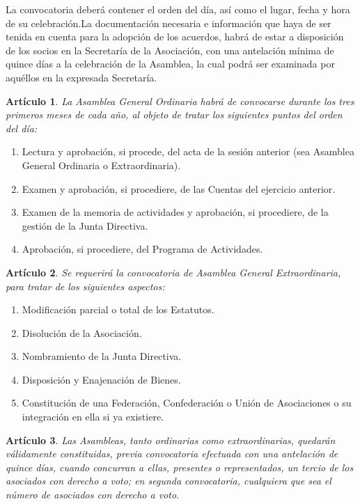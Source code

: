 \documentclass[a4paper,12pt]{article}
\theoremstyle{mystyle}		%
\newtheorem{art}{Artículo}	%
\begin{document}
\begin{onehalfspace}
La convocatoria deberá contener el orden del día, así como el lugar, fecha y hora de su celebración.La documentación necesaria e información que haya de ser tenida en cuenta para la adopción de los acuerdos, habrá de estar a disposición de los socios en la Secretaría de la Asociación, con una antelación mínima de quince días a la celebración de la Asamblea, la cual podrá ser examinada por aquéllos en la expresada Secretaría.

\begin{art}
La Asamblea General Ordinaria habrá de convocarse durante los tres primeros meses de cada año, al objeto de tratar los siguientes puntos del orden del día:
\end{art}
\begin{enumerate}[label={\arabic*.-}]
 \item Lectura y aprobación, si procede, del acta de la sesión anterior (sea Asamblea General Ordinaria o Extraordinaria).
 \item Examen y aprobación, si procediere, de las Cuentas del ejercicio anterior.
 \item Examen de la memoria de actividades y aprobación, si procediere, de la gestión de la Junta Directiva.
 \item Aprobación, si procediere, del Programa de Actividades.
\end{enumerate}

\begin{art}
Se requerirá la convocatoria de Asamblea General Extraordinaria, para tratar de los siguientes aspectos:
\end{art}
\begin{enumerate}[label={\arabic*.-}]
\item Modificación parcial o total de los Estatutos.
\item Disolución de la Asociación.
\item Nombramiento de la Junta Directiva.
\item Disposición y Enajenación de Bienes.
\item Constitución de una Federación, Confederación o Unión de Asociaciones o su integración en ella si ya existiere.
\end{enumerate}

\begin{art}
Las Asambleas, tanto ordinarias como extraordinarias, quedarán válidamente constituidas, previa convocatoria efectuada con una antelación de quince días, cuando concurran a ellas, presentes o representados, un tercio de los asociados con derecho a voto; en segunda convocatoria, cualquiera que sea el número de asociados con derecho a voto.
\end{art}


\end{onehalfspace}
\end{document}
